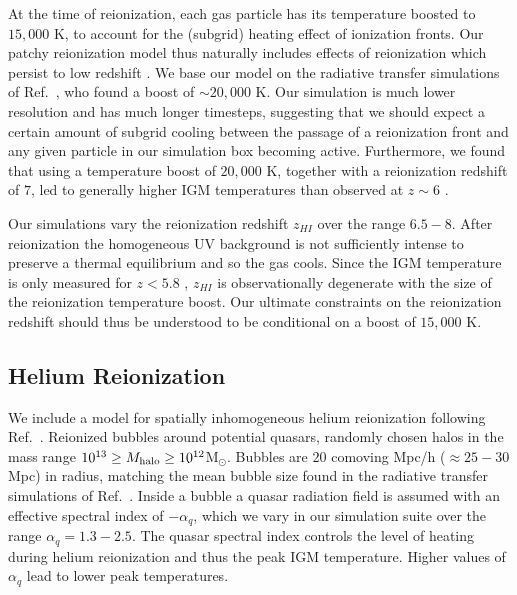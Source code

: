 \documentclass[a4paper,11pt]{article}
\begin{document}
At the time of reionization, each gas particle has its temperature boosted to $15,000$ K, to account for the (subgrid) heating effect of ionization fronts. Our patchy reionization model thus naturally includes effects of reionization which persist to low redshift \citep{Montero:2019}.
We base our model on the radiative transfer simulations of Ref.~\citep{DAloisio:2019}, who found a boost of $\sim 20,000$ K. Our simulation is much lower resolution and has much longer timesteps, suggesting that we should expect a certain amount of subgrid cooling between the passage of a reionization front and any given particle in our simulation box becoming active. Furthermore, we found that using a temperature boost of $20,000$ K, together with a reionization redshift of $7$, led to generally higher IGM temperatures than observed at $z\sim 6$ \cite{Gaikwad:2020}.

Our simulations vary the reionization redshift $z_{HI}$ over the range $6.5 - 8$. After reionization the homogeneous UV background is not sufficiently intense to preserve a thermal equilibrium and so the gas cools. Since the IGM temperature is only measured for $z < 5.8$ \cite{Gaikwad:2020}, $z_{HI}$ is observationally degenerate with the size of the reionization temperature boost. Our ultimate constraints on the reionization redshift should thus be understood to be conditional on a boost of $15,000$ K.




\subsection{Helium Reionization}
\label{sec:helium}

We include a model for spatially inhomogeneous helium reionization following Ref.~\cite{UptonSanderbeck:2020}. Reionized bubbles around potential quasars, randomly chosen halos in the mass range $10^{13} \geq M_{\rm halo}\geq 10^{12}$M$_{\odot}$. Bubbles are $20$ comoving Mpc/h ($\approx 25 - 30$ Mpc) in radius, matching the mean bubble size found in the radiative transfer simulations of Ref.~\citep{McQuinn:2009}. Inside a bubble a quasar radiation field is assumed with an effective spectral index of $ - \alpha_q$, which we vary in our simulation suite over the range $\alpha_q  = 1.3 - 2.5$. The quasar spectral index controls the level of heating during helium reionization and thus the peak IGM temperature. Higher values of $\alpha_q$ lead to lower peak temperatures.
\end{document}
